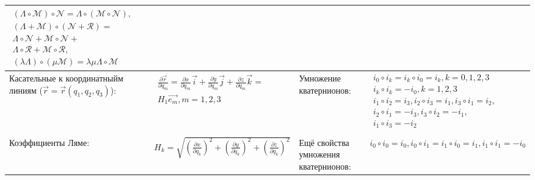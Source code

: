 \documentclass{article}
\begin{document}
\begin{tabular}{ |p{3.8cm}|p{5.7cm}|p{3.8cm}|p{5.7cm}|  }
$\begin{aligned}
(\Lambda \circ \mathcal{M}) \circ \mathcal{N} =
 \Lambda \circ (\mathcal{M} \circ \mathcal{N}),             \\
(\Lambda+\mathcal{M}) \circ(\mathcal{N}+\mathcal{R}) =      \\
\Lambda \circ \mathcal{N} + \mathcal{M} \circ \mathcal{N} + \\
\Lambda \circ \mathcal{R}  +\mathcal{M} \circ \mathcal{R},  \\
(\lambda \Lambda) \circ(\mu \mathcal{M}) =
\lambda \mu \Lambda \circ \mathcal{M}
\end{aligned}$                                                               \\ %
\hline
Касательные к координатныйм линиям ($\vec{r} = \vec{r} (q_1, q_2, q_3)$):    &  %
$\begin{aligned}
\frac{\partial \vec{r}}{\partial q_m} =
\frac{\partial x}{\partial q_m} \vec{i} +
\frac{\partial y}{\partial q_m} \vec{j} +
\frac{\partial z}{\partial q_m} \vec{k} =  \\
H_1 \vec{e_m},
 m = 1, 2, 3
\end{aligned}$                                                               &  %
Умножение кватернионов:                                                      &  %
$\begin{aligned}
i_{0} \circ i_{k} = i_k \circ i_0 = i_k, k=0,1,2,3        \\
i_{k} \circ i_{k} = -i_{0},  k=1,2,3                      \\
i_{1} \circ i_{2} =  i_{3}, i_{2} \circ i_{3} =  i_{1},
i_{3} \circ i_{1} =  i_{2},                               \\
i_{2} \circ i_{1} = -i_{3}, i_{3} \circ i_{2} = -i_{1},   \\
i_{1} \circ i_{3} = -i_{2}                                \\
\end{aligned}$                                                               \\ %
\hline
Коэффициенты Ляме:                                                           &  %
$H_k = \sqrt{(\frac{\partial x}{\partial q_k})^2 +
 (\frac{\partial y}{\partial q_k})^2 + (\frac{\partial z}{\partial q_k})^2}$ &  %
Ещё свойства умножения кватернионов:                                         &  %
$i_0 \circ i_0 = i_0, i_0 \circ i_1 = i_1 \circ i_0 = i_1,
 i_1 \circ i_1 = -i_0$                                                       \\ %

\end{tabular}
\end{document}
